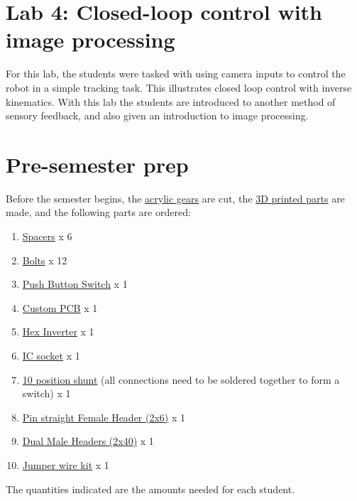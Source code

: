 \section{Lab  4: Closed-loop control with image processing}

For this lab, the students were tasked with using camera inputs to control the robot in a simple tracking task. This illustrates closed loop control with inverse kinematics. With this lab the students are introduced to another method of sensory feedback, and also given an  introduction to image processing.



\section{Pre-semester prep}
 
Before the semester begins, the \href{https://github.com/BIsichei/OWI-GUI/tree/master/PotHolders/Cut}{acrylic gears} are cut, the \href{https://github.com/BIsichei/OWI-GUI/tree/master/PotHolders/Print}{3D printed parts} are made, and the following parts are ordered: 
\begin{enumerate}
\item \href{https://www.amazon.com/dp/B016ENWDG0}{Spacers}  x 6
\item \href{https://www.amazon.com/dp/B012TE12CY/}{Bolts} x 12
\item \href{https://www.amazon.com/dp/B00W0YUV1W/}{Push Button Switch} x 1
\item \href{https://oshpark.com/shared_projects/iEyo6nkB}{Custom PCB}  x 1
\item \href{https://www.digikey.com/product-detail/en/texas-instruments/SN74HC14N/296-1577-5-ND/277223}{Hex Inverter}  x 1
\item \href{https://www.digikey.com/product-detail/en/on-shore-technology-inc/ED14DT/ED3045-5-ND/4147595}{IC socket}  x 1
\item \href{https://www.digikey.com/products/en?keywords=sam8950-nd}{10 position shunt}  (all connections need to be soldered together to form a switch) x 1
\item \href{https://www.pololu.com/product/1026}{Pin straight Female Header (2x6)}  x 1
\item \href{https://www.pololu.com/product/966}{ Dual Male Headers (2x40)} x 1
\item \href{https://www.amazon.com/dp/B01LZF1ZSZ/}{Jumper wire kit} x 1
\end{enumerate}
The quantities indicated are the amounts needed for each student. 

